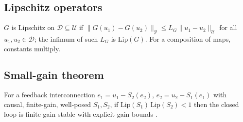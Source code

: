 \documentclass[11pt,sagev,times]{sagej}
\begin{document}
\subsection{Lipschitz operators}
$G$ is Lipschitz on $\mathcal{D}\subseteq\mathcal{U}$ if
$\|G(u_1)-G(u_2)\|_{\mathcal{Y}}\le L_G\|u_1-u_2\|_{\mathcal{U}}$ for all
$u_1,u_2\in\mathcal{D}$; the infimum of such $L_G$ is $\mathrm{Lip}(G)$.
For a composition of maps, constants multiply.

\subsection{Small-gain theorem}
For a feedback interconnection $e_1=u_1-S_2(e_2)$, $e_2=u_2+S_1(e_1)$ with
causal, finite-gain, well-posed $S_1,S_2$, if $\mathrm{Lip}(S_1)\,
\mathrm{Lip}(S_2)<1$ then the closed loop is finite-gain stable with explicit
gain bounds \citep{desoer1975feedback,khalil2002nonlinear}.
\end{document}
